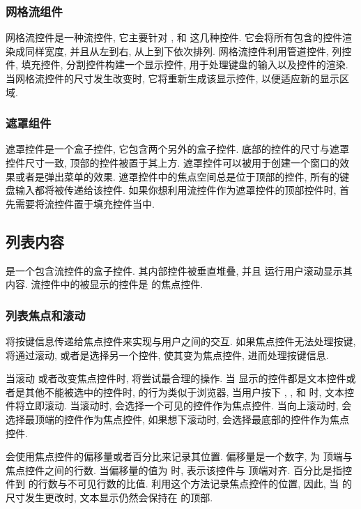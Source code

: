 \subsubsection{网格流组件}
网格流控件是一种流控件, 它主要针对 ,  和  这几种控件. 它会将所有包含的控件渲染成同样宽度, 并且从左到右, 从上到下依次排列. 网格流控件利用管道控件, 列控件, 填充控件, 分割控件构建一个显示控件, 用于处理键盘的输入以及控件的渲染. 当网格流控件的尺寸发生改变时, 它将重新生成该显示控件, 以便适应新的显示区域.

\subsubsection{遮罩组件}
遮罩控件是一个盒子控件, 它包含两个另外的盒子控件. 底部的控件的尺寸与遮罩控件尺寸一致, 顶部的控件被置于其上方. 遮罩控件可以被用于创建一个窗口的效果或者是弹出菜单的效果. 遮罩控件中的焦点空间总是位于顶部的控件, 所有的键盘输入都将被传递给该控件. 如果你想利用流控件作为遮罩控件的顶部控件时, 首先需要将流控件置于填充控件当中.

\subsection{列表内容}
\indent{} 是一个包含流控件的盒子控件. 其内部控件被垂直堆叠, 并且  运行用户滚动显示其内容. 流控件中的被显示的控件是  的焦点控件.

\subsubsection{列表焦点和滚动}
\indent{} 将按键信息传递给焦点控件来实现与用户之间的交互. 如果焦点控件无法处理按键,  将通过滚动, 或者是选择另一个控件, 使其变为焦点控件, 进而处理按键信息.

当滚动  或者改变焦点控件时,  将尝试最合理的操作. 当  显示的控件都是文本控件或者是其他不能被选中的控件时,  的行为类似于浏览器, 当用户按下 , ,  和  时, 文本控件将立即滚动. 当滚动时,  会选择一个可见的控件作为焦点控件. 当向上滚动时,  会选择最顶端的控件作为焦点控件, 如果想下滚动时,  会选择最底部的控件作为焦点控件.

\indent{} 会使用焦点控件的偏移量或者百分比来记录其位置. 偏移量是一个数字, 为  顶端与焦点控件之间的行数. 当偏移量的值为  时, 表示该控件与  顶端对齐. 百分比是指控件到  的行数与不可见行数的比值.  利用这个方法记录焦点控件的位置, 因此, 当  的尺寸发生更改时, 文本显示仍然会保持在  的顶部.

